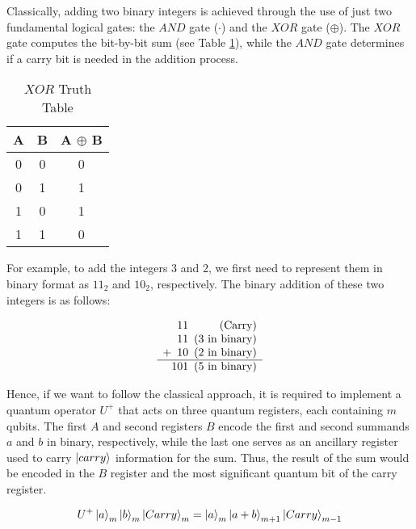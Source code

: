 \documentclass[12pt, a4paper]{article}
\begin{document}
    Classically, adding two binary integers is achieved through the use of just two fundamental logical gates: the $AND$ gate ($\cdot$) and the $XOR$ gate ($\oplus$). The $XOR$ gate computes the bit-by-bit sum (see Table \ref{tab:XOR}), while the $AND$ gate determines if a carry bit is needed in the addition process.

    \begin{table}[h]
        \centering
        \caption{$XOR$ Truth Table}
        \label{tab:XOR}
        \begin{tabular}{cc|c}
            A & B & A $\oplus$ B \\
            \hline
            0 & 0 & 0 \\
            0 & 1 & 1 \\
            1 & 0 & 1 \\
            1 & 1 & 0 \\
            \hline
        \end{tabular}
    \end{table}

    For example, to add the integers 3 and 2, we first need to represent them in binary format as $11_2$ and $10_2$, respectively. The binary addition of these two integers is as follows:

    \begin{equation}
        \begin{array}{c@{}c@{}c@{}c@{\hspace{0.5em}}r}
            &   & 1 & 1 & {\text{(Carry)}} \\
            &   & 1 & 1 & \text{(3 in binary)} \\
          + &   & 1 & 0 & \text{(2 in binary)} \\
          \hline
            & 1 & 0 & 1 & \text{(5 in binary)}
        \end{array}
    \end{equation}

    Hence, if we want to follow the classical approach, it is required to implement a quantum operator $U^+$ that acts on three quantum registers, each containing $m$ qubits. The first $A$ and second registers $B$ encode the first and second summands $a$ and $b$ in binary, respectively, while the last one serves as an ancillary register used to carry $\ket{carry}$ information for the sum. Thus, the result of the sum would be encoded in the $B$ register and the most significant quantum bit of the carry register.

    \begin{equation}
        U^+\ket{a}_m\ket{b}_m\ket{Carry}_m = \ket{a}_m\ket{a+ b}_{m+1}\ket{Carry}_{m-1}
    \end{equation}
\end{document}
